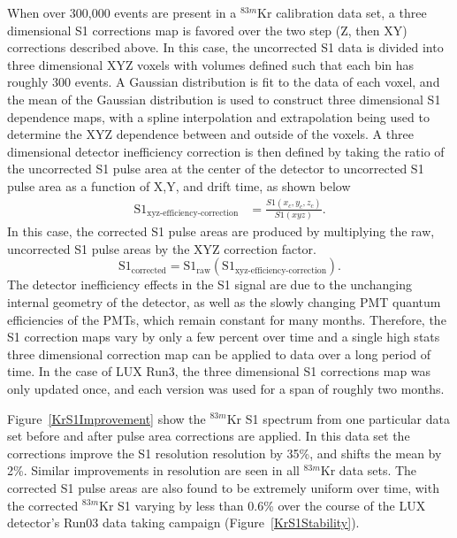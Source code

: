 When over 300,000 events are present in a $^{83m}$Kr calibration data set, a three dimensional S1 corrections map is favored over the two step (Z, then XY) corrections described above.  In this case, the uncorrected S1 data is divided into three dimensional XYZ voxels with volumes defined such that each bin has roughly 300 events. A Gaussian distribution is fit to the data of each voxel, and the mean of the Gaussian distribution is used to construct three dimensional S1 dependence maps, with a spline interpolation and extrapolation being used to determine the XYZ dependence between and outside of the voxels. A three dimensional detector inefficiency correction is then defined by taking the ratio of the uncorrected S1 pulse area at the center of the detector to uncorrected S1 pulse area as a function of X,Y, and drift time, as shown below
\begin{align}
\mbox{S}1_{\mbox{xyz-efficiency-correction}} &= \frac{S1(x_c,y_c,z_c)}{S1(xyz)}.
\end{align} 
In this case, the corrected S1 pulse areas are produced by multiplying the raw, uncorrected S1 pulse areas by the XYZ correction factor.
\begin{equation}
\mbox{S}1_{\mbox{corrected}} = \mbox{S}1_{\mbox{raw}} \left( \mbox{S}1_{\mbox{xyz-efficiency-correction}} \right).
\end{equation}
The detector inefficiency effects in the S1 signal are due to the unchanging internal geometry of the detector, as well as the slowly changing PMT quantum efficiencies of the PMTs, which remain constant for many months.  Therefore, the S1 correction maps vary by only a few percent over time and a single high stats three dimensional correction map can be applied to data over a long period of time.  In the case of LUX Run3, the three dimensional S1 corrections map was only updated once, and each version was used for a span of roughly two months.

Figure~\ref{KrS1Improvement} show the $^{83m}$Kr S1 spectrum from one particular data set before and after pulse area corrections are applied. In this data set the corrections improve the S1 resolution resolution by 35\%, and shifts the mean by 2\%.  Similar improvements in resolution are seen in all $^{83m}$Kr data sets.  The corrected S1 pulse areas are also found to be extremely uniform over time, with the corrected $^{83m}$Kr S1 varying by less than 0.6\% over the course of the LUX detector's Run03 data taking campaign (Figure~\ref{KrS1Stability}).


